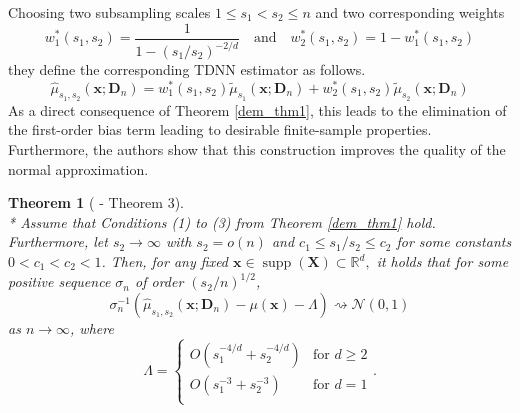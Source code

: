 \documentclass[letterpaper,10pt]{article}
\numberwithin{equation}{section}
\newtheorem{thm}{Theorem}
\numberwithin{thm}{section}
\numberwithin{lem}{section}
\numberwithin{cor}{section}
\renewcommand{\hat}{\widehat}
\newcommand{\1}{\mathbbm{1}}
\begin{document}
Choosing two subsampling scales $1 \leq s_1 < s_2 \leq n$ and two corresponding weights
\begin{equation}
	w_1^{*}(s_1, s_2) = \frac{1}{1-(s_1/s_2)^{-2/d}}
	\quad\text{and}\quad
	w_2^{*}(s_1, s_2) = 1 - w_1^{*}(s_1, s_2)
\end{equation}
they define the corresponding TDNN estimator as follows.
\begin{equation}
	\hat{\mu}_{s_1, s_2}\left(\mathbf{x}; \mathbf{D}_n\right)
	= w_1^{*}(s_1, s_2)\tilde{\mu}_{s_1}\left(\mathbf{x}; \mathbf{D}_n\right) + w_2^{*}(s_1, s_2)\tilde{\mu}_{s_2}\left(\mathbf{x}; \mathbf{D}_n\right)
\end{equation}
As a direct consequence of Theorem \ref{dem_thm1}, this leads to the elimination of the first-order bias term leading to desirable finite-sample properties.
Furthermore, the authors show that this construction improves the quality of the normal approximation.


\begin{thm}[\citet{demirkaya_optimal_2024} - Theorem 3]\label{dem_thm3}\mbox{}\\*
	Assume that Conditions (1) to (3) from Theorem \ref{dem_thm1} hold.
	Furthermore, let $s_2 \rightarrow \infty$ with $s_2 = o(n)$ and $c_1 \leq s_1/s_2 \leq c_2$ for some constants $0 < c_1 < c_2 < 1$.
	Then, for any fixed $\mathbf{x} \in \operatorname{supp}(\mathbf{X}) \subset \mathbb{R}^d,$ it holds that for some positive sequence $\sigma_n$ of order $(s_2/n)^{1/2}$,
	\begin{equation}
		\sigma_n^{-1} \left(\hat{\mu}_{s_1, s_2}\left(\mathbf{x}; \mathbf{D}_n\right) - \mu(\mathbf{x}) - \Lambda\right) \rightsquigarrow \mathcal{N}(0,1)
	\end{equation}
	as $n \rightarrow \infty$, where
	\begin{equation*}
		\Lambda = \begin{cases}
			O\left(s_1^{-4/d} + s_2^{-4/d}\right) & \text{for } d \geq 2 \\
			O\left(s_1^{-3} + s_2^{-3}\right)     & \text{for } d = 1    \\
		\end{cases}.
	\end{equation*}
\end{thm}
\end{document}
